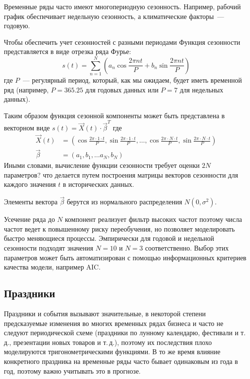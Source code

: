 \documentclass[a4paper,14pt]{extarticle}
\begin{document}
Временные ряды часто имеют многопериодную сезонность.
Например, рабочий график обеспечивает недельную сезонность, а климатические факторы~--- годовую.

Чтобы обеспечить учет сезонностей с разными периодами Функция сезонности представляется в виде  отрезка ряда Фурье:
$$
s(t) = \sum_{n=1}^N\left(a_n \cos \frac{2\pi n t}{P} + b_n \sin \frac{2\pi n t}{P}\right)
$$
где $P$~--- регулярный период, который, как мы ожидаем, будет иметь временной ряд (например, $P = 365.25$ для годовых данных или $P = 7$ для недельных данных).

Таким образом функция сезонной компоненты может быть представлена в векторном виде 
$s(t) = \vec{X}(t) \cdot \vec{\beta}^T$ 
где 
\begin{align*}
\vec{X}(t) &= \left( \cos \frac{2\pi\cdot 1 \cdot t}{P},\sin \frac{2\pi\cdot 1 \cdot t}{P}, \ldots, \cos\frac{2\pi\cdot N \cdot t}{P},\sin \frac{2\pi\cdot N \cdot t}{P}\right)\\
\vec{\beta} &= (a_1,b_1,\ldots a_N, b_N)
\end{align*}
Иными словами, вычисление функции сезонности требует оценки $2N$ параметров? что делается путем построения матрицы векторов сезонности для каждого значения $t$ в исторических данных.


Элементы вектора $\vec\beta$ берутся из нормального распределения $N(0, \sigma ^2)$.

Усечение ряда до $N$ компонент реализует фильтр высоких частот поэтому числа частот ведет к повышенному риску переобучения, но позволяет моделировать быстро меняющиеся процессы. Эмпирически для годовой и недельной сезонности подходят значения $N = 10$ и $N = 3$ соответственно.
Выбор этих параметров может быть автоматизирован с помощью
информационных критериев качества модели, например AIC.

\subsection{Праздники}

Праздники и события вызывают значительные, в некоторой степени предсказуемые изменения во многих временных
рядах бизнеса и часто не следуют периодической схеме (праздники по лунному календарю, фестивали и т.\, д., презентации новых товаров и т.\,д.), поэтому их последствия плохо моделируются тригонометрическими функциями.
В то же время влияние конкретного праздника на временные ряды часто бывает одинаковым из года в год, поэтому
важно учитывать это в прогнозе.
\end{document}

